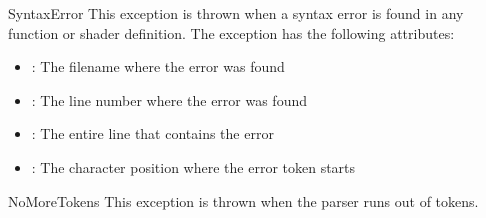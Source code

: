 \begin{excdesc}{SyntaxError}
This exception is thrown when a syntax error is found in any function
or shader definition. The exception has the following attributes:

\begin{itemize}
\item {}: The filename where the error was found 
\item {}: The line number where the error was found 
\item {}: The entire line that contains the error 
\item {}: The character position where the error token starts
\end{itemize}
\end{excdesc}

\begin{excdesc}{NoMoreTokens}
This exception is thrown when the parser runs out of tokens.
\end{excdesc}
